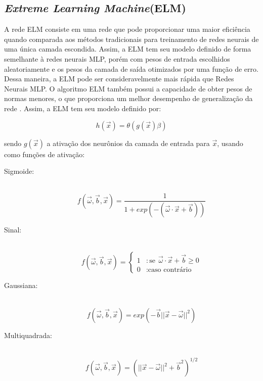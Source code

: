 \documentclass[12pt,a4paper,utf8]{ppgsi}
\begin{document}
\begin{algorithm}[htb]
\begin{algorithmic}
\end{algorithmic}
\end{algorithm}


\subsection{\textit{Extreme Learning Machine}(ELM)}

A rede ELM consiste em uma rede que pode proporcionar uma maior eficiência quando comparada aos métodos tradicionais para treinamento de redes neurais de uma única camada escondida. Assim, a ELM tem seu modelo definido de forma semelhante à redes neurais MLP, porém com pesos de entrada escolhidos aleatoriamente e os pesos da camada de saída otimizados por uma função de erro. Dessa maneira, a ELM pode ser consideravelmente mais rápida que Redes Neurais MLP. O algoritmo ELM também possui a capacidade de obter pesos de normas menores, o que proporciona um melhor desempenho de generalização da rede \citep{huang2006extreme}. Assim, a ELM tem seu modelo definido por:

\begin{dmath*} \label{eq:modelelm}
    h(\vec{x}) = \theta \left( g(\vec{x}) \beta \right)
\end{dmath*}

sendo $g(\vec{x})$ a ativação dos neurônios da camada de entrada para $\vec{x}$, usando como funções de ativação:

\begin{description}
  \item[Sigmoide:] \hfill \\
  $$f(\vec{\omega}, \vec{b}, \vec{x}) = \frac{1}{1 + exp(-( \vec{\omega} \cdot \vec{x} + \vec{b} ))}$$
  \item[Sinal:] \hfill \\
  \begin{displaymath}
     f(\vec{\omega}, \vec{b}, \vec{x}) =  \left\{
       \begin{array}{lr}
         1 & : \textrm{se} \:\: \vec{\omega} \cdot \vec{x} + \vec{b} \geq 0\\
         0 & : \textrm{caso contrário}
       \end{array}
     \right.
  \end{displaymath}
  \item[Gaussiana:] \hfill \\
  $$f(\vec{\omega}, \vec{b}, \vec{x}) = exp( -\vec{b} ||\vec{x} - \vec{\omega}||^2 )$$
  \item[Multiquadrada:] \hfill \\
  $$f(\vec{\omega}, \vec{b}, \vec{x}) = ( ||\vec{x} - \vec{\omega}||^2 + \vec{b}^2 )^{1/2}$$
\end{description}
\end{document}
